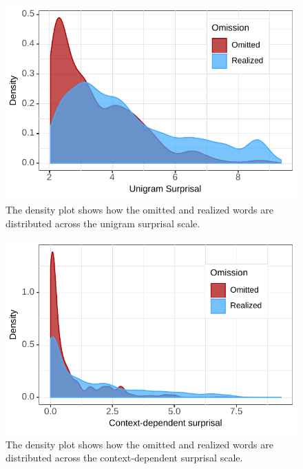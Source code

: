 \begin{figure}[t]
  \includegraphics{figures/scr_production_density_unigram}
   \caption{The density plot shows how the omitted and realized words are distributed across the unigram surprisal scale.\label{fig:production_density-unigram}}
\end{figure}

\begin{figure}[t]
  \includegraphics{figures/scr_production_density_context}
     \caption{The density plot shows how the omitted and realized words are distributed across the context-dependent surprisal scale.\label{fig:production_density-context}}
\end{figure}

